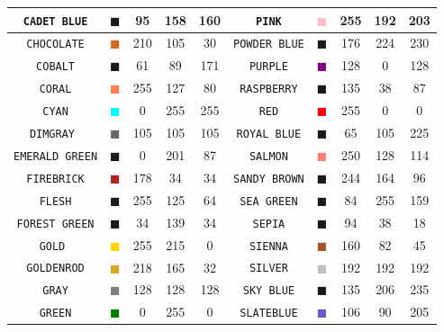 \documentclass[11pt]{book}
\newcommand{\ct}{\tt\small}
\begin{document}
\begin{table}[p]
\begin{center}
\begin{tabular}{|c|c|c|c|c|c||c|c|c|c|}
{\ct CADET BLUE} & \textcolor{CADET BLUE} {$\blacksquare$} & 95& 158& 160& {\ct PINK} &  \textcolor{PINK} {$\blacksquare$} & 255& 192& 203  \\ \hline
{\ct CHOCOLATE} & \textcolor{CHOCOLATE} {$\blacksquare$} & 210& 105& 30& {\ct POWDER BLUE} &  \textcolor{POWDER BLUE} {$\blacksquare$} & 176& 224& 230  \\ \hline
{\ct COBALT} & \textcolor{COBALT} {$\blacksquare$} & 61& 89& 171& {\ct PURPLE} &  \textcolor{PURPLE} {$\blacksquare$} & 128& 0& 128  \\ \hline
{\ct CORAL} & \textcolor{CORAL} {$\blacksquare$} & 255& 127& 80& {\ct RASPBERRY} &  \textcolor{RASPBERRY} {$\blacksquare$} & 135& 38& 87  \\ \hline
{\ct CYAN} & \textcolor{CYAN} {$\blacksquare$} & 0& 255& 255& {\ct RED} &  \textcolor{RED} {$\blacksquare$} & 255& 0& 0  \\ \hline
{\ct DIMGRAY } & \textcolor{DIMGRAY } {$\blacksquare$} & 105& 105& 105& {\ct ROYAL BLUE} &  \textcolor{ROYAL BLUE} {$\blacksquare$} & 65& 105& 225  \\ \hline
{\ct EMERALD GREEN} & \textcolor{EMERALD GREEN} {$\blacksquare$} & 0& 201& 87& {\ct SALMON} &  \textcolor{SALMON} {$\blacksquare$} & 250& 128& 114  \\ \hline
{\ct FIREBRICK} & \textcolor{FIREBRICK} {$\blacksquare$} & 178& 34& 34& {\ct SANDY BROWN} &  \textcolor{SANDY BROWN} {$\blacksquare$} & 244& 164& 96  \\ \hline
{\ct FLESH} & \textcolor{FLESH} {$\blacksquare$} & 255& 125& 64& {\ct SEA GREEN} &  \textcolor{SEA GREEN} {$\blacksquare$} & 84& 255& 159  \\ \hline
{\ct FOREST GREEN} & \textcolor{FOREST GREEN} {$\blacksquare$} & 34& 139& 34& {\ct SEPIA} &  \textcolor{SEPIA} {$\blacksquare$} & 94& 38& 18  \\ \hline
{\ct GOLD } & \textcolor{GOLD } {$\blacksquare$} & 255& 215& 0& {\ct SIENNA} &  \textcolor{SIENNA} {$\blacksquare$} & 160& 82& 45  \\ \hline
{\ct GOLDENROD} & \textcolor{GOLDENROD} {$\blacksquare$} & 218& 165& 32& {\ct SILVER} &  \textcolor{SILVER} {$\blacksquare$} & 192& 192& 192  \\ \hline
{\ct GRAY} & \textcolor{GRAY} {$\blacksquare$} & 128& 128& 128& {\ct SKY BLUE} &  \textcolor{SKY BLUE} {$\blacksquare$} & 135& 206& 235  \\ \hline
{\ct GREEN} & \textcolor{GREEN} {$\blacksquare$} & 0& 255& 0& {\ct SLATEBLUE} &  \textcolor{SLATEBLUE} {$\blacksquare$} & 106& 90& 205  \\ \hline

\end{tabular}
\end{center}
\end{table}
\end{document}

